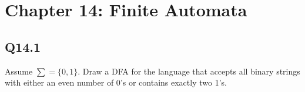 \documentclass{article}
\begin{document}
\section*{Chapter 14: Finite Automata}

\subsection*{Q14.1}
Assume $\sum=\{0,1\}$. Draw a DFA for the language that accepts all binary strings with either an even number of 0's or contains exactly two 1's.
\newpage
\end{document}
